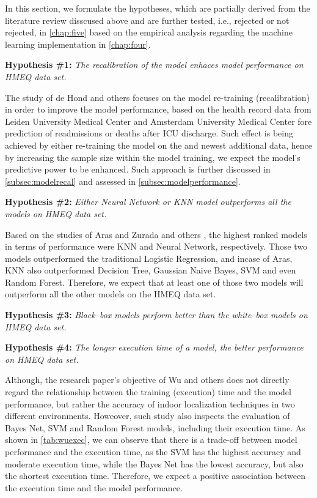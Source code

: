 In this section, we formulate the hypotheses, which are partially derived from the literature review disscused above and are further tested, i.e., rejected or not rejected, in \autoref{chap:five} based on the empirical analysis regarding the machine learning implementation in \autoref{chap:four}.
\vspace{0.3cm}

\noindent \textbf{Hypothesis \#1:} \textit{The recalibration of the model enhaces model performance on HMEQ data set.}

The study of de Hond and others \citep{de2023predicting} focuses on the model re-training (recalibration) in order to improve the model performance, based on the health record data from Leiden University Medical Center and Amsterdam University Medical Center fore prediction of readmissions or deaths after ICU discharge.
Such effect is being achieved by either re-training the model on the and newest additional data, hence by increasing the sample size within the model training, we expect the model's predictive power to be enhanced. Such approach is further discussed in \autoref{subsec:modelrecal} and assessed in \autoref{subsec:modelperformance}.
\vspace{0.3cm}


\noindent \textbf{Hypothesis \#2:} \textit{Either Neural Network or KNN model outperforms all the models on HMEQ data set.}

Based on the studies of Aras \citep{serkan2021bagging} and Zurada and others \citep{zurada2014classification}, the highest ranked models in terms of performance were KNN and Neural Network, respectively. Those two models outperformed the traditional Logistic Regression, and incase of Aras, KNN also outperformed Decision Tree, Gaussian Naive Bayes, SVM and even Random Forest.
Therefore, we expect that at least one of those two models will outperform all the other models on the HMEQ data set.

\vspace{0.3cm}

\noindent \textbf{Hypothesis \#3:} \textit{Black--box models perform better than the white--box models on HMEQ data set.}


\vspace{0.3cm}


\noindent \textbf{Hypothesis \#4:} \textit{The longer execution time of a model, the better performance on HMEQ data set.}

Although, the research paper's objective of Wu and others \citep{wu2018accurate} does not directly regard the relationship between the training (execution) time and the model performance, but rather the accuracy of indoor localization techniques in two different environments.
Howeover, such study also inspects the evaluation of Bayes Net, SVM and Random Forest models, including their execution time. As shown in \autoref{tab:wuexec}, we can observe that there is a trade-off between model performance and the execution time, as the SVM has the highest accuracy and moderate execution time, while the Bayes Net has the lowest accuracy, but also the shortest execution time.
Therefore, we expect a positive association between the execution time and the model performance.

